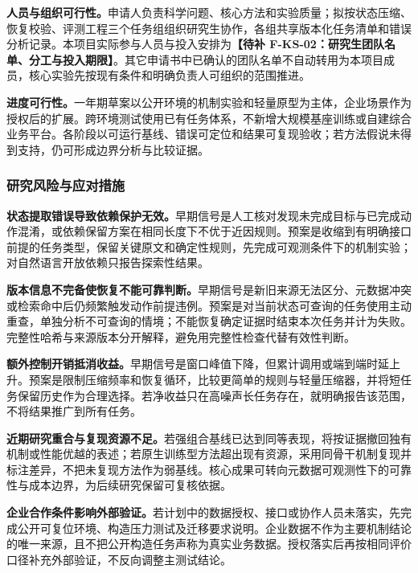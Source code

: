 \textbf{人员与组织可行性。}申请人负责科学问题、核心方法和实验质量；拟按状态压缩、恢复校验、评测工程三个任务组组织研究生协作，各组共享版本化任务清单和错误分析记录。本项目实际参与人员与投入安排为\textbf{【待补 F-KS-02：研究生团队名单、分工与投入期限】}。其它申请书中已确认的团队名单不自动转用为本项目成员，核心实验先按现有条件和明确负责人可组织的范围推进。

\textbf{进度可行性。}一年期草案以公开环境的机制实验和轻量原型为主体，企业场景作为授权后的扩展。跨环境测试使用已有任务体系，不新增大规模基座训练或自建综合业务平台。各阶段以可运行基线、错误可定位和结果可复现验收；若方法假说未得到支持，仍可形成边界分析与比较证据。

\subsubsection{研究风险与应对措施}
\textbf{状态提取错误导致依赖保护无效。}早期信号是人工核对发现未完成目标与已完成动作混淆，或依赖保留方案在相同长度下不优于近因规则。预案是收缩到有明确接口前提的任务类型，保留关键原文和确定性规则，先完成可观测条件下的机制实验；对自然语言开放依赖只报告探索性结果。

\textbf{版本信息不完备使恢复不能可靠判断。}早期信号是新旧来源无法区分、元数据冲突或检索命中后仍频繁触发动作前提违例。预案是对当前状态可查询的任务使用主动重查，单独分析不可查询的情境；不能恢复确定证据时结束本次任务并计为失败。完整性哈希与来源版本分开解释，避免用完整性检查代替有效性判断。

\textbf{额外控制开销抵消收益。}早期信号是窗口峰值下降，但累计调用或端到端时延上升。预案是限制压缩频率和恢复循环，比较更简单的规则与轻量压缩器，并将短任务保留历史作为合理选择。若净收益只在高噪声长任务存在，就明确报告该范围，不将结果推广到所有任务。

\textbf{近期研究重合与复现资源不足。}若强组合基线已达到同等表现，将按证据撤回独有机制或性能优越的表述；若原生训练型方法超出现有资源，采用同骨干机制复现并标注差异，不把未复现方法作为弱基线。核心成果可转向元数据可观测性下的可靠性与成本边界，为后续研究保留可复核依据。

\textbf{企业合作条件影响外部验证。}若计划中的数据授权、接口或协作人员未落实，先完成公开可复位环境、构造压力测试及迁移要求说明。企业数据不作为主要机制结论的唯一来源，且不把公开构造任务声称为真实业务数据。授权落实后再按相同评价口径补充外部验证，不反向调整主测试结论。

